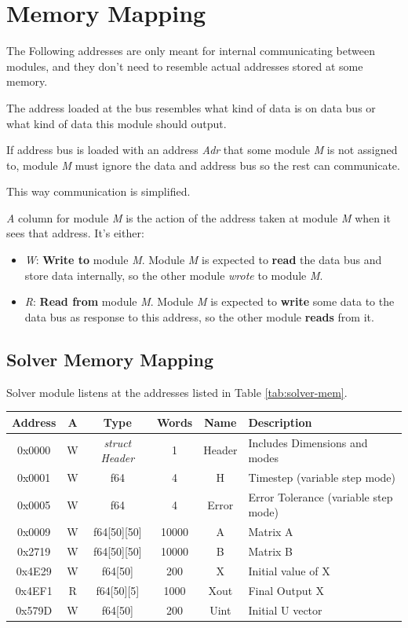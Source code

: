 \documentclass[12pt]{report}
\begin{document}
\section{Memory Mapping}
The Following addresses are only meant for internal communicating between modules, and they don't need to resemble actual addresses stored at some memory. 

The address loaded at the bus resembles what kind of data is on data bus or what kind of data this module should output.

If address bus is loaded with an address \emph{Adr} that some module \emph{M} is not assigned to, module \emph{M} must ignore the data and address bus so the rest can communicate.

This way communication is simplified.

\emph{A} column for module \emph{M} is the action of the address taken at module \emph{M} when it sees that address. It's either:

\begin{itemize}
    \item \emph{W}: \textbf{Write to} module \emph{M}. Module \emph{M} is expected to \textbf{read} the data bus and store data internally, so the other module \emph{wrote} to module \emph{M}.
    \item \emph{R}: \textbf{Read from} module \emph{M}. Module \emph{M} is expected to \textbf{write} some data to the data bus as response to this address, so the other module \textbf{reads} from it.
\end{itemize}

\subsection{Solver Memory Mapping}
Solver module listens at the addresses listed in Table \ref{tab:solver-mem}.

\begin{center}
 \begin{tabular}{||c| c| c| c| c| l||} 
 \hline
 Address & A & Type & Words & Name & Description  \\ [0.5ex] 
 \hline\hline
  0x0000 & W & \emph{struct Header} & 1 & Header & Includes Dimensions and modes  \\ 
 \hline
 0x0001  & W & f64 & 4 & H & Timestep (variable step mode)  \\
 \hline
 0x0005  & W & f64 & 4 & Error & Error Tolerance (variable step mode) \\
 \hline
 0x0009  & W & f64[50][50] & 10000 & A & Matrix A \\
 \hline
 0x2719  & W & f64[50][50] & 10000 & B & Matrix B \\
 \hline
 0x4E29  & W & f64[50] & 200 & X & Initial value of X \\
 \hline
 0x4EF1  & R & f64[50][5] & 1000 & Xout & Final Output X \\ [1ex] 
 \hline
 0x579D  & W & f64[50] & 200 & Uint & Initial U vector \\
 \hline
\end{tabular}
\end{center}
\end{document}
